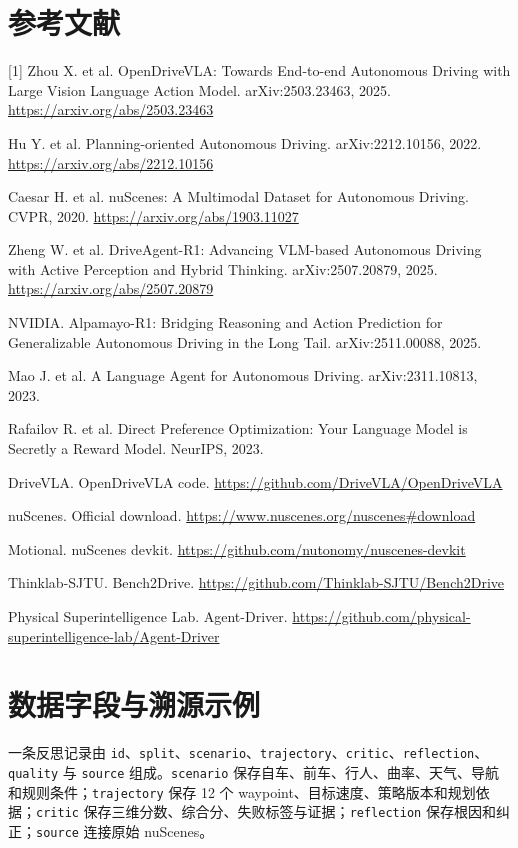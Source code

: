 \documentclass[UTF8,a4paper,12pt,fontset=fandol]{ctexart}
\begin{document}
\section*{参考文献}
[1] Zhou X. et al. OpenDriveVLA: Towards End-to-end Autonomous Driving with Large Vision Language Action Model. arXiv:2503.23463, 2025. \url{https://arxiv.org/abs/2503.23463}\par
[2] Hu Y. et al. Planning-oriented Autonomous Driving. arXiv:2212.10156, 2022. \url{https://arxiv.org/abs/2212.10156}\par
[3] Caesar H. et al. nuScenes: A Multimodal Dataset for Autonomous Driving. CVPR, 2020. \url{https://arxiv.org/abs/1903.11027}\par
[4] Zheng W. et al. DriveAgent-R1: Advancing VLM-based Autonomous Driving with Active Perception and Hybrid Thinking. arXiv:2507.20879, 2025. \url{https://arxiv.org/abs/2507.20879}\par
[5] NVIDIA. Alpamayo-R1: Bridging Reasoning and Action Prediction for Generalizable Autonomous Driving in the Long Tail. arXiv:2511.00088, 2025.\par
[6] Mao J. et al. A Language Agent for Autonomous Driving. arXiv:2311.10813, 2023.\par
[7] Rafailov R. et al. Direct Preference Optimization: Your Language Model is Secretly a Reward Model. NeurIPS, 2023.\par
[8] DriveVLA. OpenDriveVLA code. \url{https://github.com/DriveVLA/OpenDriveVLA}\par
[9] nuScenes. Official download. \url{https://www.nuscenes.org/nuscenes\#download}\par
[10] Motional. nuScenes devkit. \url{https://github.com/nutonomy/nuscenes-devkit}\par
[11] Thinklab-SJTU. Bench2Drive. \url{https://github.com/Thinklab-SJTU/Bench2Drive}\par
[12] Physical Superintelligence Lab. Agent-Driver. \url{https://github.com/physical-superintelligence-lab/Agent-Driver}\par

\appendix
\section{数据字段与溯源示例}
一条反思记录由 \texttt{id}、\texttt{split}、\texttt{scenario}、\texttt{trajectory}、\texttt{critic}、\texttt{reflection}、\texttt{quality} 与 \texttt{source} 组成。\texttt{scenario} 保存自车、前车、行人、曲率、天气、导航和规则条件；\texttt{trajectory} 保存 12 个 waypoint、目标速度、策略版本和规划依据；\texttt{critic} 保存三维分数、综合分、失败标签与证据；\texttt{reflection} 保存根因和纠正；\texttt{source} 连接原始 nuScenes。
\end{document}
